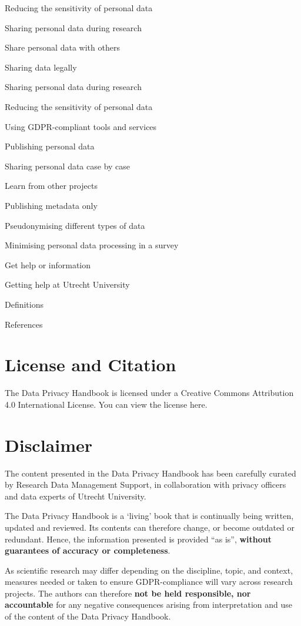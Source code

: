 \documentclass[
]{book}
\begin{document}
Reducing the sensitivity of personal data

Sharing personal data during research

Share personal data with others

Sharing data legally

Sharing personal data during research

Reducing the sensitivity of personal data

Using GDPR-compliant tools and services

Publishing personal data

Sharing personal data case by case

Learn from other projects

Publishing metadata only

Pseudonymising different types of data

Minimising personal data processing in a survey

Get help or information

Getting help at Utrecht University

Definitions

References

\hypertarget{license-and-citation}{%
\section{License and Citation}\label{license-and-citation}}

The Data Privacy Handbook is licensed under a Creative Commons Attribution 4.0 International License. You can
view
the license here.

\hypertarget{disclaimer}{%
\section{Disclaimer}\label{disclaimer}}

The content presented in the Data Privacy Handbook has been carefully curated by
Research Data Management Support, in collaboration with privacy officers and
data experts of Utrecht University.

The Data Privacy Handbook is a `living' book that is continually being written,
updated and reviewed. Its contents can therefore change, or become outdated or
redundant. Hence, the information presented is provided ``as is'', \textbf{without
guarantees of accuracy or completeness}.

As scientific research may differ depending on the discipline, topic, and
context, measures needed or taken to ensure GDPR-compliance will vary across
research projects. The authors can therefore \textbf{not be held responsible, nor
accountable} for any negative consequences arising from interpretation and use
of the content of the Data Privacy Handbook.
\end{document}
